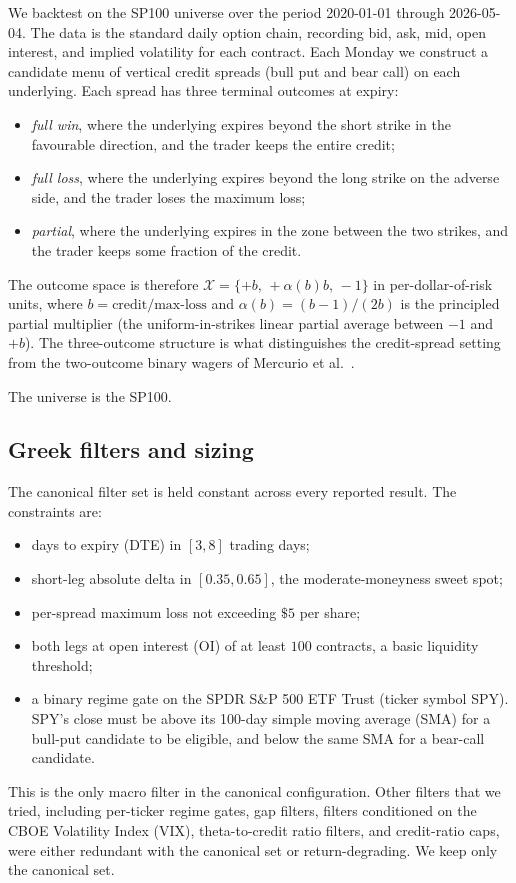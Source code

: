 \documentclass[11pt]{article}
\theoremstyle{definition}
\theoremstyle{remark}
\newcommand{\X}{\mathcal{X}}
\begin{document}
We backtest on the SP100 universe over the period 2020-01-01
through 2026-05-04. The data is the standard daily option chain,
recording bid, ask, mid, open interest, and implied volatility for
each contract. Each Monday we construct a candidate menu of
vertical credit spreads (bull put and bear call) on each
underlying. Each spread has three terminal outcomes at expiry:
\begin{itemize}
    \item \emph{full win}, where the underlying expires beyond the
        short strike in the favourable direction, and the trader
        keeps the entire credit;
    \item \emph{full loss}, where the underlying expires beyond
        the long strike on the adverse side, and the trader loses
        the maximum loss;
    \item \emph{partial}, where the underlying expires in the zone
        between the two strikes, and the trader keeps some
        fraction of the credit.
\end{itemize}
The outcome space is therefore $\X = \{+b,\, +\alpha(b) b,\, -1\}$
in per-dollar-of-risk units, where $b = \text{credit} /
\text{max-loss}$ and $\alpha(b) = (b - 1) / (2b)$ is the principled
partial multiplier (the uniform-in-strikes linear partial average
between $-1$ and $+b$). The three-outcome structure is what
distinguishes the credit-spread setting from the two-outcome binary
wagers of Mercurio et al.\ \cite{mercurio2020binary}.

The universe is the SP100.

\subsection{Greek filters and sizing}\label{sec:filters}

The canonical filter set is held constant across every reported
result. The constraints are:
\begin{itemize}
    \item days to expiry (DTE) in $[3, 8]$ trading days;
    \item short-leg absolute delta in $[0.35, 0.65]$, the
        moderate-moneyness sweet spot;
    \item per-spread maximum loss not exceeding $\$5$ per share;
    \item both legs at open interest (OI) of at least $100$
        contracts, a basic liquidity threshold;
    \item a binary regime gate on the SPDR S\&P 500 ETF Trust
        (ticker symbol SPY). SPY's close must be above its 100-day
        simple moving average (SMA) for a bull-put candidate to be
        eligible, and below the same SMA for a bear-call candidate.
\end{itemize}
This is the only macro filter in the canonical configuration.
Other filters that we tried, including per-ticker regime gates,
gap filters, filters conditioned on the CBOE Volatility Index (VIX),
theta-to-credit ratio filters, and credit-ratio caps, were either
redundant with the canonical set or return-degrading. We keep only
the canonical set.
\end{document}
